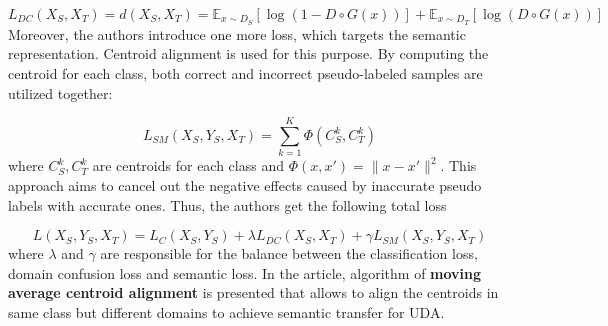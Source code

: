  $$
 L_{DC}(X_S, X_T) = d(X_S, X_T) = \mathbb{E}_{x \sim D_S} [\log(1 - D \circ G(x))] + \mathbb{E}_{x \sim D_T} [\log(D \circ G(x))] 
 $$
Moreover, the authors introduce one more loss, which targets the semantic representation. Centroid alignment is used for this purpose. By computing the centroid for each class, both correct and incorrect pseudo-labeled samples are utilized together: 

$$
L_{SM}(X_S, Y_S, X_T) = \sum_{k=1}^K \Phi(C_S^k, C_T^k)
$$
where $C_S^k, C_T^k$ are centroids for each class and $\Phi(x, x') = \| x - x' \|^2$. This approach aims to cancel out the negative effects caused by inaccurate pseudo labels with accurate ones. Thus, the authors get the following total loss

 $$
 L(X_S, Y_S, X_T) = L_C(X_S, Y_S) + \lambda L_{DC}(X_S, X_T) + \gamma L_{SM}(X_S, Y_S, X_T)
 $$
 where $\lambda$ and $\gamma$ are responsible for the balance between the classification
loss, domain confusion loss and semantic loss. In the article, algorithm of \textbf{moving average centroid alignment} is presented that allows to align the centroids in same class
but different domains to achieve semantic transfer for UDA.